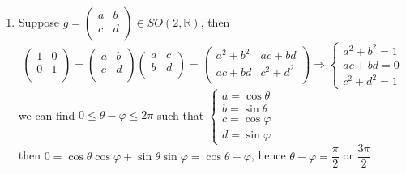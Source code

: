 \documentclass[main]{subfiles}
\begin{document}
\begin{solution}
\begin{enumerate}[label=(\alph*),leftmargin=*]
\item Suppose $g=\left( {\begin{array}{cc}
   a & b \\
   c & d \\
  \end{array} } \right) \in SO(2,\mathbb{R})$, then 
  $$\left( {\begin{array}{cc}
   1 & 0 \\
   0 & 1 \\
  \end{array} } \right)=\left( {\begin{array}{cc}
   a & b \\
   c & d \\
  \end{array} } \right)\left( {\begin{array}{cc}
   a & c \\
   b & d \\
  \end{array} } \right)=\left( {\begin{array}{cc}
   a^2+b^2 & ac+bd \\
   ac+bd & c^2+d^2 \\
  \end{array} } \right)\Rightarrow \begin{cases}
  a^2+b^2=1 \\
  ac+bd=0 \\
  c^2+d^2=1
  \end{cases}$$
 we can find $0\leq\theta-\varphi\leq2\pi$ such that $\begin{cases}
  a=\cos{\theta} \\
  b=\sin{\theta} \\
  c=\cos{\varphi} \\
  d=\sin{\varphi}
  \end{cases}$ \\
then $0=\cos{\theta}\cos{\varphi}+\sin{\theta}\sin{\varphi}=\cos{\theta-\varphi}$, hence $\theta-\varphi=\dfrac{\pi}{2}$ or $\dfrac{3\pi}{2}$ \par


\end{enumerate}
\end{solution}
\end{document}
